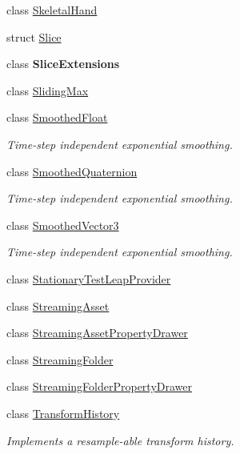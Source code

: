\begin{DoxyCompactItemize}
\item 
class \mbox{\hyperlink{class_leap_1_1_unity_1_1_skeletal_hand}{Skeletal\+Hand}}
\item 
struct \mbox{\hyperlink{struct_leap_1_1_unity_1_1_slice}{Slice}}
\item 
class {\bfseries Slice\+Extensions}
\item 
class \mbox{\hyperlink{class_leap_1_1_unity_1_1_sliding_max}{Sliding\+Max}}
\item 
class \mbox{\hyperlink{class_leap_1_1_unity_1_1_smoothed_float}{Smoothed\+Float}}
\begin{DoxyCompactList}\small\item\em Time-\/step independent exponential smoothing. \end{DoxyCompactList}\item 
class \mbox{\hyperlink{class_leap_1_1_unity_1_1_smoothed_quaternion}{Smoothed\+Quaternion}}
\begin{DoxyCompactList}\small\item\em Time-\/step independent exponential smoothing. \end{DoxyCompactList}\item 
class \mbox{\hyperlink{class_leap_1_1_unity_1_1_smoothed_vector3}{Smoothed\+Vector3}}
\begin{DoxyCompactList}\small\item\em Time-\/step independent exponential smoothing. \end{DoxyCompactList}\item 
class \mbox{\hyperlink{class_leap_1_1_unity_1_1_stationary_test_leap_provider}{Stationary\+Test\+Leap\+Provider}}
\item 
class \mbox{\hyperlink{class_leap_1_1_unity_1_1_streaming_asset}{Streaming\+Asset}}
\item 
class \mbox{\hyperlink{class_leap_1_1_unity_1_1_streaming_asset_property_drawer}{Streaming\+Asset\+Property\+Drawer}}
\item 
class \mbox{\hyperlink{class_leap_1_1_unity_1_1_streaming_folder}{Streaming\+Folder}}
\item 
class \mbox{\hyperlink{class_leap_1_1_unity_1_1_streaming_folder_property_drawer}{Streaming\+Folder\+Property\+Drawer}}
\item 
class \mbox{\hyperlink{class_leap_1_1_unity_1_1_transform_history}{Transform\+History}}
\begin{DoxyCompactList}\small\item\em Implements a resample-\/able transform history. \end{DoxyCompactList}\item 

\end{DoxyCompactItemize}
